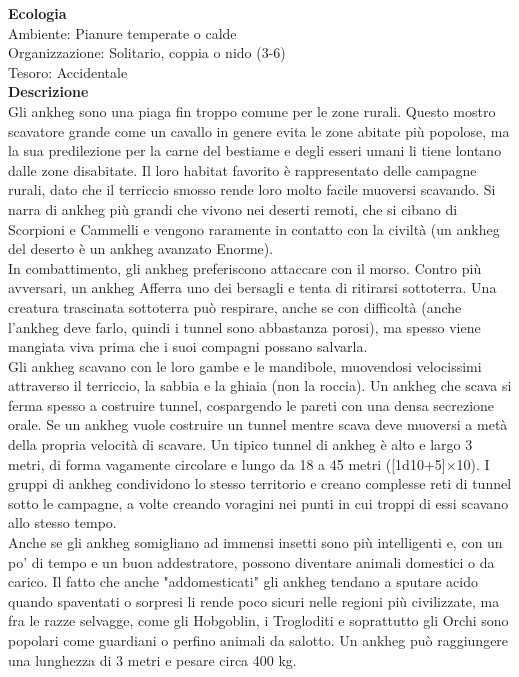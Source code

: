\begin{multicols}{2}
\textbf{Ecologia}\\
Ambiente: Pianure temperate o calde\\
Organizzazione: Solitario, coppia o nido (3-6)\\
Tesoro: Accidentale\\
\textbf{Descrizione}\\
Gli ankheg sono una piaga fin troppo comune per le zone rurali. Questo mostro scavatore grande come un cavallo in genere evita le zone abitate più popolose, ma la sua predilezione per la carne del bestiame e degli esseri umani li tiene lontano dalle zone disabitate. Il loro habitat favorito è rappresentato delle campagne rurali, dato che il terriccio smosso rende loro molto facile muoversi scavando. Si narra di ankheg più grandi che vivono nei deserti remoti, che si cibano di Scorpioni e Cammelli e vengono raramente in contatto con la civiltà (un ankheg del deserto è un ankheg avanzato Enorme).\\
In combattimento, gli ankheg preferiscono attaccare con il morso. Contro più avversari, un ankheg Afferra uno dei bersagli e tenta di ritirarsi sottoterra. Una creatura trascinata sottoterra può respirare, anche se con difficoltà (anche l'ankheg deve farlo, quindi i tunnel sono abbastanza porosi), ma spesso viene mangiata viva prima che i suoi compagni possano salvarla.\\
Gli ankheg scavano con le loro gambe e le mandibole, muovendosi velocissimi attraverso il terriccio, la sabbia e la ghiaia (non la roccia). Un ankheg che scava si ferma spesso a costruire tunnel, cospargendo le pareti con una densa secrezione orale. Se un ankheg vuole costruire un tunnel mentre scava deve muoversi a metà della propria velocità di scavare. Un tipico tunnel di ankheg è alto e largo 3 metri, di forma vagamente circolare e lungo da 18 a 45 metri ([1d10+5]×10). I gruppi di ankheg condividono lo stesso territorio e creano complesse reti di tunnel sotto le campagne, a volte creando voragini nei punti in cui troppi di essi scavano allo stesso tempo.\\
Anche se gli ankheg somigliano ad immensi insetti sono più intelligenti e, con un po' di tempo e un buon addestratore, possono diventare animali domestici o da carico. Il fatto che anche "addomesticati" gli ankheg tendano a sputare acido quando spaventati o sorpresi li rende poco sicuri nelle regioni più civilizzate, ma fra le razze selvagge, come gli Hobgoblin, i Trogloditi e soprattutto gli Orchi sono popolari come guardiani o perfino animali da salotto. Un ankheg può raggiungere una lunghezza di 3 metri e pesare circa 400 kg.\\



\end{multicols}
